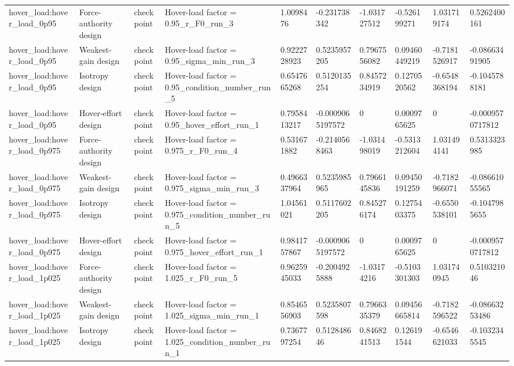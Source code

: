 \begin{tabular}{@{}llllllllll@{}}
hover\_load:hover\_load\_0p95 & Force-authority design & checkpoint & Hover-load factor = 0.95\_r\_F0\_run\_3 & 1.0098476 & -0.231738342 & -1.031727512 & -0.526199271 & 1.031719174 & 0.5262400161 \\
hover\_load:hover\_load\_0p95 & Weakest-gain design & checkpoint & Hover-load factor = 0.95\_sigma\_min\_run\_3 & 0.9222728923 & 0.5235957205 & 0.7967556082 & 0.09460449219 & -0.7181526917 & -0.08663491905 \\
hover\_load:hover\_load\_0p95 & Isotropy design & checkpoint & Hover-load factor = 0.95\_condition\_number\_run\_5 & 0.6547665268 & 0.5120135254 & 0.8457234919 & 0.1270520562 & -0.6548368194 & -0.1045788181 \\
hover\_load:hover\_load\_0p95 & Hover-effort design & checkpoint & Hover-load factor = 0.95\_hover\_effort\_run\_1 & 0.7958413217 & -0.0009065197572 & 0 & 0.0009765625 & 0 & -0.0009570717812 \\
hover\_load:hover\_load\_0p975 & Force-authority design & checkpoint & Hover-load factor = 0.975\_r\_F0\_run\_4 & 0.531671882 & -0.2140568463 & -1.031498019 & -0.5313212604 & 1.031494141 & 0.5313323985 \\
hover\_load:hover\_load\_0p975 & Weakest-gain design & checkpoint & Hover-load factor = 0.975\_sigma\_min\_run\_3 & 0.4966337964 & 0.5235985965 & 0.7966145836 & 0.09450191259 & -0.7182966071 & -0.08661055565 \\
hover\_load:hover\_load\_0p975 & Isotropy design & checkpoint & Hover-load factor = 0.975\_condition\_number\_run\_5 & 1.04561021 & 0.5117602205 & 0.845276174 & 0.1275403375 & -0.6550538101 & -0.1047985655 \\
hover\_load:hover\_load\_0p975 & Hover-effort design & checkpoint & Hover-load factor = 0.975\_hover\_effort\_run\_1 & 0.9841757867 & -0.0009065197572 & 0 & 0.0009765625 & 0 & -0.0009570717812 \\
hover\_load:hover\_load\_1p025 & Force-authority design & checkpoint & Hover-load factor = 1.025\_r\_F0\_run\_5 & 0.9625945033 & -0.2004925888 & -1.03174216 & -0.5103301303 & 1.031740945 & 0.510321046 \\
hover\_load:hover\_load\_1p025 & Weakest-gain design & checkpoint & Hover-load factor = 1.025\_sigma\_min\_run\_1 & 0.8546556903 & 0.5235807598 & 0.7966335379 & 0.09456665814 & -0.7182596522 & -0.08663253486 \\
hover\_load:hover\_load\_1p025 & Isotropy design & checkpoint & Hover-load factor = 1.025\_condition\_number\_run\_1 & 0.7367797254 & 0.512848646 & 0.8468241513 & 0.126191544 & -0.6546621033 & -0.1032345545 \\

\end{tabular}
